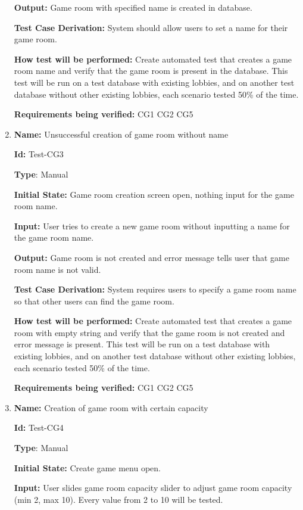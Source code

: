 \documentclass[12pt, titlepage]{article}
\begin{document}
\begin{enumerate}
\textbf{Output:} Game room with specified name is created in database.

\textbf{Test Case Derivation:} System should allow users to set a name for their game room.

\textbf{How test will be performed:} Create automated test that creates a game room name and verify that the game room is present in the database. This test will be run on a test database with existing lobbies, and on another test database without other existing lobbies, each scenario tested 50\% of the time.

\textbf{Requirements being verified:} CG1 CG2 CG5

\item{\textbf{Name:} Unsuccessful creation of game room without name} \label{itm:Test-CG3}

\textbf{Id:} Test-CG3

\textbf{Type}: Manual

\textbf{Initial State:} Game room creation screen open, nothing input for the game room name.

\textbf{Input:} User tries to create a new game room without inputting a name for the game room name.

\textbf{Output:} Game room is not created and error message tells user that game room name is not valid.

\textbf{Test Case Derivation:} System requires users to specify a game room name so that other users can find the game room.

\textbf{How test will be performed:} Create automated test that creates a game room with empty string and verify that the game room is not created and error message is present. This test will be run on a test database with existing lobbies, and on another test database without other existing lobbies, each scenario tested 50\% of the time.

\textbf{Requirements being verified:} CG1 CG2 CG5

\item{\textbf{Name:} Creation of game room with certain capacity} \label{itm:Test-CG4}

\textbf{Id:} Test-CG4

\textbf{Type}: Manual

\textbf{Initial State:} Create game menu open.

\textbf{Input:} User slides game room capacity slider to adjust game room capacity (min 2, max 10). Every value from 2 to 10 will be tested. 


\end{enumerate}
\end{document}
